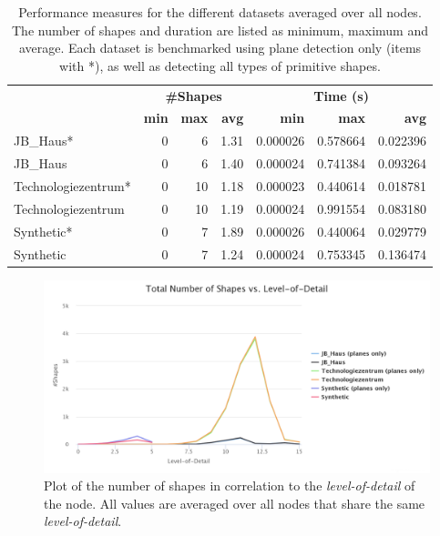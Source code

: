 \begin{table}
	\centering
	\begin{tabular}{ l || r | r | r || r | r | r}
			&\multicolumn{3}{c||}{\textbf{\#Shapes}} & \multicolumn{3}{c}{\textbf{Time (s)}}\\
			&\textbf{min} & \textbf{max} & \textbf{avg}  & \textbf{min} & \textbf{max} & \textbf{avg}  \\
			\hline
			JB\_Haus*							& 0 & 6  & 1.31 & 0.000026 & 0.578664 & 0.022396 \\
			JB\_Haus 							& 0 & 6  & 1.40 & 0.000024 & 0.741384 & 0.093264 \\
			Technologiezentrum*		& 0 & 10 & 1.18 & 0.000023 & 0.440614 & 0.018781 \\
			Technologiezentrum 		& 0 & 10 & 1.19 & 0.000024 & 0.991554 & 0.083180 \\
			Synthetic*						& 0 & 7  & 1.89 & 0.000026 & 0.440064 & 0.029779 \\
			Synthetic 						& 0 & 7  & 1.24 & 0.000024 & 0.753345 & 0.136474 \\
		\end{tabular}
	\caption{Performance measures for the different datasets averaged over all nodes. The number of shapes and duration are listed as minimum, maximum and average. Each dataset is benchmarked using plane detection only (items with *), as well as detecting all types of primitive shapes. }
	\label{table:schnabel_benchmarks}
\end{table}


\begin{figure}[h]
    \centering
    \includegraphics[width=1\textwidth]{Results/shapes_total_vs_lod.png}
    \caption{Plot of the number of shapes in correlation to the \textit{level-of-detail} of the node. All values are averaged over all nodes that share the same \textit{level-of-detail}.}
    \label{fig:shapes_total_vs_lod}
\end{figure}

